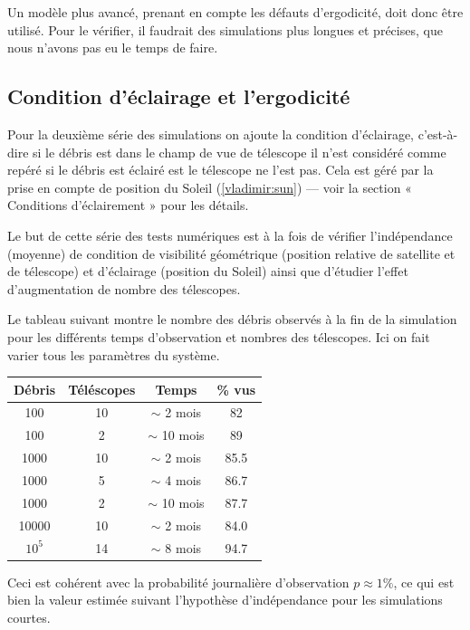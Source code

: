 Un modèle plus avancé, prenant en compte les défauts d'ergodicité,
doit donc être utilisé. Pour le vérifier, il faudrait des simulations
plus longues et précises, que nous n'avons pas eu le temps de faire.  
\subsection{Condition d'\'eclairage et l'ergodicit\'e}  
Pour la deuxi\`eme s\'erie des simulations on ajoute la condition d'\'eclairage, c'est-\`a-dire 
si le d\'ebris est dans le champ de vue de t\'elescope il n'est consid\'er\'e comme rep\'er\'e
si le d\'ebris est \'eclair\'e est le t\'elescope ne l'est pas. Cela est g\'er\'e par la prise 
en compte de position du Soleil (\autoref{vladimir:sun}) --- voir la section 
« Conditions d'\'eclairement » pour les d\'etails. 

Le but de cette s\'erie des tests num\'eriques est \`a la fois de v\'erifier 
l'ind\'ependance (moyenne) de condition de visibilit\'e g\'eom\'etrique (position
relative de satellite et de t\'elescope) et d'\'eclairage (position
du Soleil) ainsi que d'\'etudier l'effet d'augmentation de nombre des
t\'elescopes. 

Le tableau suivant montre le nombre des d\'ebris observ\'es
\`a la fin de la simulation pour les diff\'erents temps d'observation et nombres des
t\'elescopes. Ici on fait varier tous les param\`etres du syst\`eme.

\begin{center}
\begin{tabular}{|c|c|c|c|} \hline
 D\'ebris & T\'el\'escopes & Temps & \% vus \\ 
 \hline \hline
 100 & 10 & $\sim$ 2 mois &82 \\
 \hline
 100 & 2 & $\sim$ 10 mois &89 \\
 \hline
 \hline
 1000 & 10 & $\sim$ 2 mois &85.5 \\
 \hline
 1000 & 5 & $\sim$ 4 mois &86.7 \\
 \hline
 1000 & 2 & $\sim$ 10 mois &87.7 \\
 \hline  
 \hline
 10000 & 10 & $\sim$ 2 mois &84.0 \\
 \hline
 \hline
 $10^5$ & 14 & $\sim$ 8 mois &  94.7 \\
 \hline
\end{tabular} 
\end{center}
Ceci est coh\'erent avec la probabilit\'e journali\`ere d'observation 
   $p \approx 1\%$, ce qui est bien la valeur estim\'ee suivant l'hypoth\`ese 
   d'ind\'ependance pour les simulations courtes. 
   
